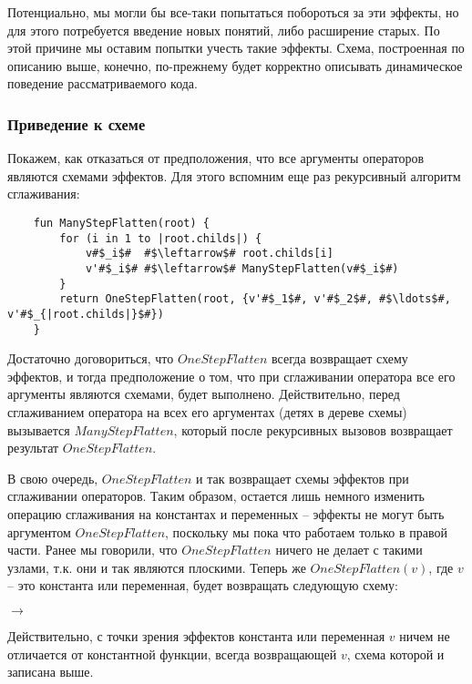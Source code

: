 Потенциально, мы могли бы все-таки попытаться побороться за эти эффекты, но для этого потребуется введение новых понятий, либо расширение старых. По этой причине мы оставим попытки учесть такие эффекты. Схема, построенная по описанию выше, конечно, по-прежнему будет корректно описывать динамическое поведение рассматриваемого кода.




\subsubsection{Приведение к схеме}

Покажем, как отказаться от предположения, что все аргументы операторов являются схемами эффектов. Для этого вспомним еще раз рекурсивный алгоритм сглаживания:

\begin{verbatim}
    fun ManyStepFlatten(root) {
        for (i in 1 to |root.childs|) {
            v#$_i$#  #$\leftarrow$# root.childs[i]
            v'#$_i$# #$\leftarrow$# ManyStepFlatten(v#$_i$#) 
        }
        return OneStepFlatten(root, {v'#$_1$#, v'#$_2$#, #$\ldots$#, v'#$_{|root.childs|}$#})
    }
\end{verbatim}

Достаточно договориться, что $OneStepFlatten$ всегда возвращает схему эффектов, и тогда предположение о том, что при сглаживании оператора все его аргументы являются схемами, будет выполнено. Действительно, перед сглаживанием оператора на всех его аргументах (детях в дереве схемы) вызывается $ManyStepFlatten$, который после рекурсивных вызовов возвращает результат $OneStepFlatten$.

В свою очередь, $OneStepFlatten$ и так возвращает схемы эффектов при сглаживании операторов. Таким образом, остается лишь немного изменить операцию сглаживания на константах и переменных -- эффекты не могут быть аргументом $OneStepFlatten$, поскольку мы пока что работаем только в правой части. Ранее мы говорили, что $OneStepFlatten$ ничего не делает с такими узлами, т.к. они и так являются плоскими. Теперь же $OneStepFlatten(v)$, где $v$ -- это константа или переменная, будет возвращать следующую схему: 



{
	 $\rightarrow$ 	
}{}

Действительно, с точки зрения эффектов константа или переменная $v$ ничем не отличается от константной функции, всегда возвращающей $v$, схема которой и записана выше. 

